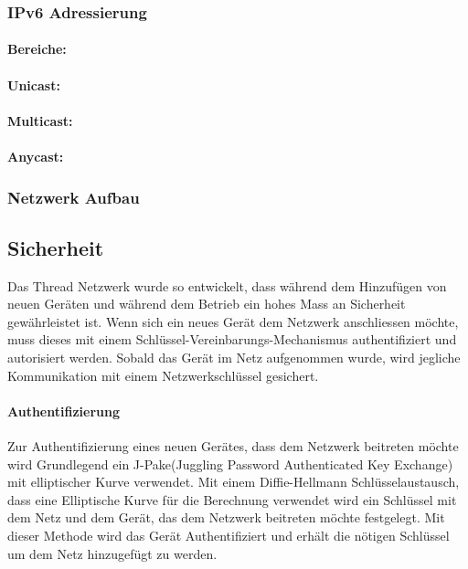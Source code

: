 \subsubsection{IPv6 Adressierung}\label{subsubsec:IPv6Adressierung}
\paragraph{Bereiche:}

\paragraph{Unicast:}

\paragraph{Multicast:}

\paragraph{Anycast:}

\subsubsection{Netzwerk Aufbau}\label{subsubsec:NetzwerkAufbau}

\newpage

\subsection{Sicherheit}\label{subsec:Sicherheit}
Das Thread Netzwerk wurde so entwickelt, dass während dem Hinzufügen von neuen Geräten und während dem Betrieb ein hohes Mass an Sicherheit gewährleistet ist. Wenn sich ein neues Gerät dem Netzwerk anschliessen möchte, muss dieses mit einem Schlüssel-Vereinbarungs-Mechanismus authentifiziert und autorisiert werden. Sobald das Gerät im Netz aufgenommen wurde, wird jegliche Kommunikation mit einem Netzwerkschlüssel gesichert.

\paragraph{Authentifizierung}
Zur Authentifizierung eines neuen Gerätes, dass dem Netzwerk beitreten möchte wird Grundlegend ein J-Pake(Juggling Password Authenticated Key Exchange) mit elliptischer Kurve verwendet. Mit einem Diffie-Hellmann Schlüsselaustausch, dass eine Elliptische Kurve für die Berechnung verwendet wird ein Schlüssel mit dem Netz und dem Gerät, das dem Netzwerk beitreten möchte festgelegt. Mit dieser Methode wird das Gerät Authentifiziert und erhält die nötigen Schlüssel um dem Netz hinzugefügt zu werden. \cite[Seite 1-4]{thread_group_inc_thread_2017}

